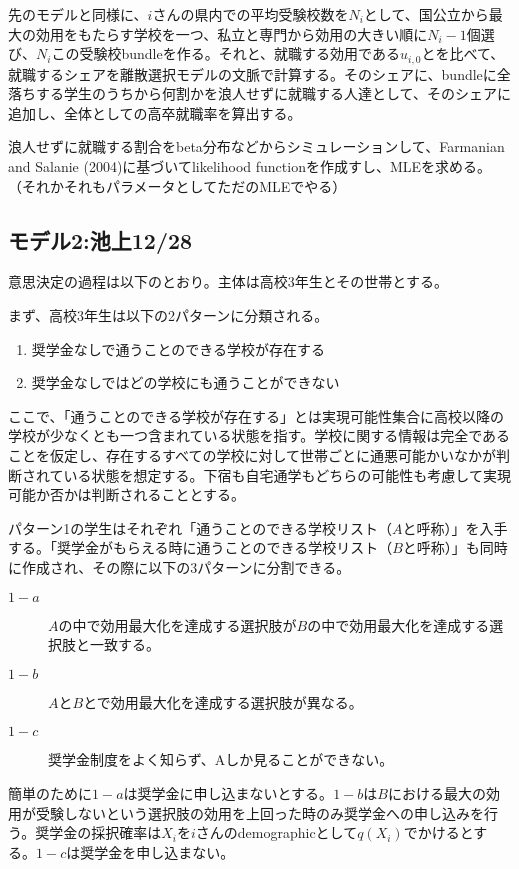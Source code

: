 \documentclass{jsarticle}
\begin{document}
	\par
	先のモデルと同様に、$i$さんの県内での平均受験校数を$N_i$として、国公立から最大の効用をもたらす学校を一つ、私立と専門から効用の大きい順に$N_i -1$個選び、$N_i$この受験校bundleを作る。それと、就職する効用である$u_{i, 0}$とを比べて、就職するシェアを離散選択モデルの文脈で計算する。そのシェアに、bundleに全落ちする学生のうちから何割かを浪人せずに就職する人達として、そのシェアに追加し、全体としての高卒就職率を算出する。
	\par
	浪人せずに就職する割合をbeta分布などからシミュレーションして、Farmanian and Salanie (2004)に基づいてlikelihood functionを作成すし、MLEを求める。（それかそれもパラメータとしてただのMLEでやる）
	
	\subsection{モデル2:池上12/28}
	意思決定の過程は以下のとおり。主体は高校3年生とその世帯とする。
	\par
	まず、高校3年生は以下の2パターンに分類される。
	\begin{enumerate}
		\item 奨学金なしで通うことのできる学校が存在する
		\item 奨学金なしではどの学校にも通うことができない
	\end{enumerate}
	ここで、「通うことのできる学校が存在する」とは実現可能性集合に高校以降の学校が少なくとも一つ含まれている状態を指す。学校に関する情報は完全であることを仮定し、存在するすべての学校に対して世帯ごとに通悪可能かいなかが判断されている状態を想定する。下宿も自宅通学もどちらの可能性も考慮して実現可能か否かは判断されることとする。
	\par
	パターン1の学生はそれぞれ「通うことのできる学校リスト（$A$と呼称）」を入手する。「奨学金がもらえる時に通うことのできる学校リスト（$B$と呼称）」も同時に作成され、その際に以下の3パターンに分割できる。
	\begin{description}
		\item[$1-a$] $A$の中で効用最大化を達成する選択肢が$B$の中で効用最大化を達成する選択肢と一致する。
		\item[$1-b$] $A$と$B$とで効用最大化を達成する選択肢が異なる。
		\item[$1-c$] 奨学金制度をよく知らず、Aしか見ることができない。
	\end{description}
	簡単のために$1-a$は奨学金に申し込まないとする。$1-b$は$B$における最大の効用が受験しないという選択肢の効用を上回った時のみ奨学金への申し込みを行う。奨学金の採択確率は$X_i$を$i$さんのdemographicとして$q(X_i)$でかけるとする。$1-c$は奨学金を申し込まない。
\end{document}
